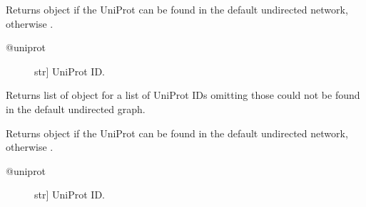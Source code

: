 \documentclass[letterpaper,10pt,english]{sphinxmanual}
\begin{document}
\begin{fulllineitems}
\begin{fulllineitems}
\begin{quote}
\begin{description}
\begin{itemize}
\end{itemize}

\end{description}\end{quote}

\end{fulllineitems}


\begin{fulllineitems}
\label{\detokenize{main:pypath.main.PyPath.uniprot}}
Returns  object if the UniProt
can be found in the default undirected network,
otherwise .
\begin{description}
\item[{@uniprot}] \leavevmode{[}str{]}
UniProt ID.

\end{description}

\end{fulllineitems}


\begin{fulllineitems}
\label{\detokenize{main:pypath.main.PyPath.uniprots}}
Returns list of  object
for a list of UniProt IDs omitting those
could not be found in the default
undirected graph.

\end{fulllineitems}


\begin{fulllineitems}
\label{\detokenize{main:pypath.main.PyPath.up}}
Returns  object if the UniProt
can be found in the default undirected network,
otherwise .
\begin{description}
\item[{@uniprot}] \leavevmode{[}str{]}
UniProt ID.

\end{description}

\end{fulllineitems}


\end{fulllineitems}
\end{document}
